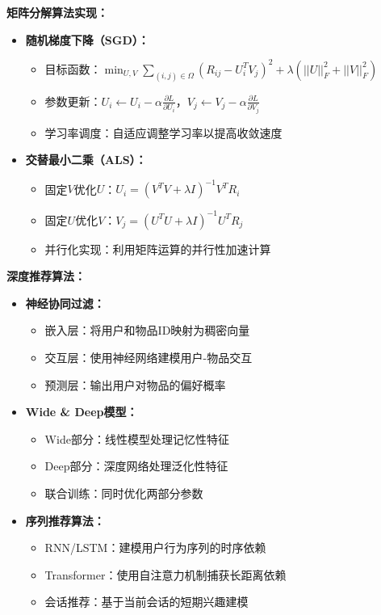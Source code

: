 \textbf{矩阵分解算法实现：}
\begin{itemize}
\item \textbf{随机梯度下降（SGD）：}
\begin{itemize}
\item 目标函数：$\min_{U,V} \sum_{(i,j) \in \Omega} (R_{ij} - U_i^T V_j)^2 + \lambda(||U||_F^2 + ||V||_F^2)$
\item 参数更新：$U_i \leftarrow U_i - \alpha \frac{\partial L}{\partial U_i}$，$V_j \leftarrow V_j - \alpha \frac{\partial L}{\partial V_j}$
\item 学习率调度：自适应调整学习率以提高收敛速度
\end{itemize}
\item \textbf{交替最小二乘（ALS）：}
\begin{itemize}
\item 固定$V$优化$U$：$U_i = (V^T V + \lambda I)^{-1} V^T R_i$
\item 固定$U$优化$V$：$V_j = (U^T U + \lambda I)^{-1} U^T R_j$
\item 并行化实现：利用矩阵运算的并行性加速计算
\end{itemize}
\end{itemize}

\textbf{深度推荐算法：}
\begin{itemize}
\item \textbf{神经协同过滤：}
\begin{itemize}
\item 嵌入层：将用户和物品ID映射为稠密向量
\item 交互层：使用神经网络建模用户-物品交互
\item 预测层：输出用户对物品的偏好概率
\end{itemize}
\item \textbf{Wide \& Deep模型：}
\begin{itemize}
\item Wide部分：线性模型处理记忆性特征
\item Deep部分：深度网络处理泛化性特征
\item 联合训练：同时优化两部分参数
\end{itemize}
\item \textbf{序列推荐算法：}
\begin{itemize}
\item RNN/LSTM：建模用户行为序列的时序依赖
\item Transformer：使用自注意力机制捕获长距离依赖
\item 会话推荐：基于当前会话的短期兴趣建模
\end{itemize}
\end{itemize}

